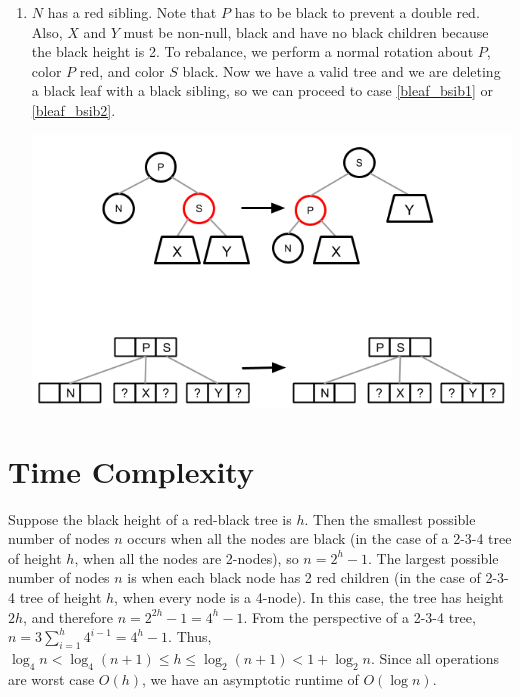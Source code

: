 \documentclass[12pt]{article}
\begin{document}
\begin{enumerate}
\begin{enumerate}
    \item $N$ has a red sibling. Note that $P$ has to be black to prevent a double red. Also, $X$ and $Y$ must be non-null, black and have no black children because the black height is 2. To rebalance, we perform a normal rotation about $P$, color $P$ red, and color $S$ black. Now we have a valid tree and we are deleting a black leaf with a black sibling, so we can proceed to case \ref{bleaf_bsib1} or \ref{bleaf_bsib2}.
    \begin{center}
      \includegraphics[scale=0.55]{pics/red_black_tree/del_bleaf_rsib}
    \end{center}

\end{enumerate}
\end{enumerate}

\section*{Time Complexity}
Suppose the black height of a red-black tree is $h$. Then the smallest possible number of nodes $n$ occurs when all the nodes are black (in the case of a 2-3-4 tree of height $h$, when all the nodes are 2-nodes), so $n = 2^h - 1$. The largest possible number of nodes $n$ is when each black node has 2 red children (in the case of 2-3-4 tree of height $h$, when every node is a 4-node). In this case, the tree has height $2h$, and therefore $n = 2^{2h} - 1 = 4^h-1$. From the perspective of a 2-3-4 tree, $n = 3 \sum_{i=1}^h 4^{i-1} = 4^h-1$. Thus, $\log_4 n < \log_4 (n + 1) \leq h \leq \log_2 (n + 1) < 1 + \log_2 n$. Since all operations are worst case $O(h)$, we have an asymptotic runtime of $O(\log n)$.
\end{document}

